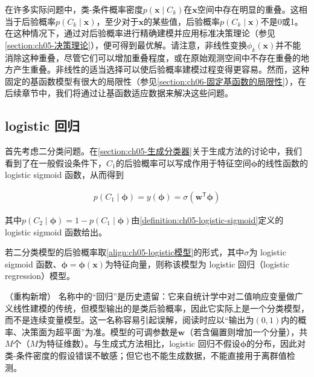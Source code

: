 \documentclass[../../main.tex]{subfiles}
\begin{document}
在许多实际问题中，类-条件概率密度$p(\boldsymbol{x}\mid C_k)$在$\boldsymbol{x}$空间中存在明显的重叠。这相当于后验概率$p(C_k\mid\boldsymbol{x})$，至少对于$\boldsymbol{x}$的某些值，后验概率$p(C_k\mid\boldsymbol{x})$不是0或1。在这种情况下，通过对后验概率进行精确建模并应用标准决策理论（参见\cref{section:ch05-决策理论}），便可得到最优解。请注意，非线性变换$\phi_k(\boldsymbol{x})$并不能消除这种重叠，尽管它们可以增加重叠程度，或在原始观测空间中不存在重叠的地方产生重叠。非线性的适当选择可以使后验概率建模过程变得更容易。然而，这种固定的基函数模型有很大的局限性（参见\cref{section:ch06-固定基函数的局限性}），在后续章节中，我们将通过让基函数适应数据来解决这些问题。

\subsection{logistic 回归}\label{subsection:ch05-logistic回归}

首先考虑二分类问题。在\cref{section:ch05-生成分类器}关于生成方法的讨论中，我们看到了在一般假设条件下，$C_1$的后验概率可以写成作用于特征空间$\boldsymbol{\phi}$的线性函数的 logistic sigmoid 函数，从而得到

\begin{align}
  p(C_1\mid\boldsymbol{\phi})=y(\boldsymbol{\phi})=\sigma\left(\boldsymbol{w}^{\mathsf{T}}\boldsymbol{\phi}\right)
  \label{align:ch05-logistic模型}
\end{align}

其中$p(C_2\mid\boldsymbol{\phi})=1-p(C_1\mid\boldsymbol{\phi})$由\cref{definition:ch05-logistic-sigmoid}定义的 logistic sigmoid 函数给出。

\begin{definition}\label{definition:ch05-logistic回归}
若二分类模型的后验概率取\eqref{align:ch05-logistic模型}的形式，其中$\sigma$为 logistic sigmoid 函数、$\boldsymbol{\phi}=\boldsymbol{\phi}(\boldsymbol{x})$为特征向量，则称该模型为 logistic 回归（logistic regression）模型。
\end{definition}

\begin{remark}（重构新增）
名称中的“回归”是历史遗留：它来自统计学中对二值响应变量做广义线性建模的传统，但模型输出的是类后验概率，因此它实际上是一个分类模型，而不是连续变量模型。这一名称容易引起误解，阅读时应以“输出为$(0,1)$内的概率、决策面为超平面”为准。模型的可调参数是$\boldsymbol{w}$（若含偏置则增加一个分量），共$M$个（$M$为特征维数）。与生成式方法相比，logistic 回归不假设$\boldsymbol{\phi}$的分布，因此对类-条件密度的假设错误不敏感；但它也不能生成数据，不能直接用于离群值检测。
\end{remark}
\end{document}
